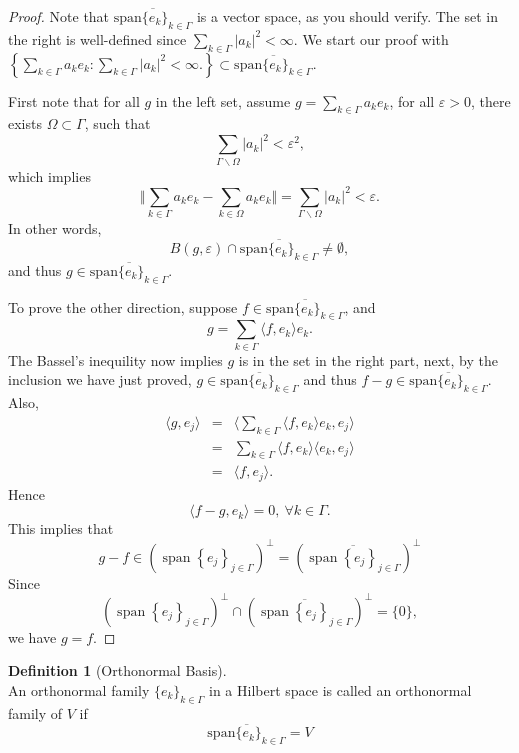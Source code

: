\documentclass[12pt]{book}
\theoremstyle{definition}
\newtheorem{definition}{Definition}[chapter]
\newcommand{\inner}[2]{{\langle #1,#2\rangle}}
\begin{document}
\begin{proof}
Note that $\overline{\mathrm{span}\{e_k\}_{k \in \Gamma}}$ is a vector space, as you should verify.
The set in the right is well-defined since $\sum_{k \in \Gamma}|a_k|^2 < \infty$. We start our proof with $\left\{ \sum_{k \in \Gamma}a_ke_k:  \sum_{k \in \Gamma}|a_k|^2 < \infty. \right\} \subset \overline{\mathrm{span}\{e_k\}_{k \in \Gamma}}$. \par
First note that for all $g$ in the left set, assume $g=\sum_{k \in \Gamma}a_ke_k$, for all $\varepsilon>0$, there exists $\Omega \subset \Gamma$, such that 
$$ 
\sum_{\Gamma \backslash \Omega}|a_k|^2 < \varepsilon^2,
$$
which implies 
$$
\Vert \sum_{k \in \Gamma}a_ke_k -\sum_{k \in \Omega}a_ke_k \Vert=\sum_{\Gamma \backslash \Omega}|a_k|^2 < \varepsilon.
$$
In other words, 
$$
B(g,\varepsilon)\cap \overline{\mathrm{span}\{e_k\}_{k \in \Gamma}} \neq\emptyset,
$$
and thus $g \in \overline{\mathrm{span}\{e_k\}_{k \in \Gamma}}$. \par
To prove the other direction, suppose $f \in \overline{\mathrm{span}\{e_k\}_{k \in \Gamma}}$, and 
$$
g = \sum_{k \in \Gamma}\inner{f}{e_k}e_k.
$$
The Bassel's inequility now implies $g$ is in the set in the right part, next, by the inclusion we have just proved, $g\in \overline{\mathrm{span}\{e_k\}_{k \in \Gamma}}$ and thus $f-g \in \overline{\mathrm{span}\{e_k\}_{k \in \Gamma}}$.
Also,
\begin{eqnarray*}
	\inner{g}{e_j} &=& \inner{\sum_{k \in \Gamma}\inner{f}{e_k}e_k}{e_j} \\
	&=& \sum_{k \in \Gamma}\inner{f}{e_k}\inner{e_k}{e_j} \\
	&=& \inner{f}{e_j}.
\end{eqnarray*}
Hence 
$$
\inner{f-g}{e_k}=0, \ \forall k \in \Gamma.
$$
This implies that 
$$
g-f \in\left(\operatorname{span}\left\{e_j\right\}_{j \in \Gamma}\right)^{\perp}=\left(\overline{\operatorname{span}\left\{e_j\right\}_{j \in \Gamma}}\right)^{\perp}
$$
Since $$
\left(\operatorname{span}\left\{e_j\right\}_{j \in \Gamma}\right)^{\perp} \cap \left(\overline{\operatorname{span}\left\{e_j\right\}_{j \in \Gamma}}\right)^{\perp} = \{0\},
$$
we have $g=f$.
\end{proof}


\begin{definition}[Orthonormal Basis] \ \\
An orthonormal family $\{e_k\}_{k \in \Gamma}$ in a Hilbert space is called an orthonormal family of $V$ if
$$
\overline{\mathrm{span}\{e_k\}_{k \in \Gamma}}= V
$$
	
\end{definition}
\end{document}
